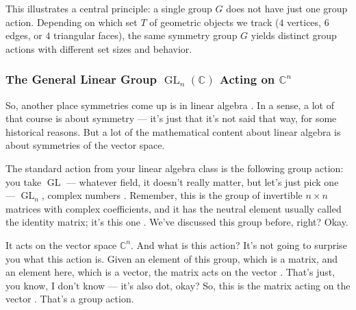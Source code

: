 \begin{content}
\begin{steps}
This illustrates a central principle: a single group $G$ does not have just one group action. Depending on which set $T$ of geometric objects we track ($4$ vertices, $6$ edges, or $4$ triangular faces), the same symmetry group $G$ yields distinct group actions with different set sizes and behavior.
\end{steps}
\end{content}

\subsubsection{The General Linear Group \texorpdfstring{$\operatorname{GL}_n(\mathbb{C})$}{GL\_n(C)} Acting on \texorpdfstring{$\mathbb{C}^n$}{C\textasciicircum n}}

\begin{speech}[00:58:29 - 01:00:01]
So, another place symmetries come up is in linear algebra . In a sense, a lot of that course is about symmetry --- it's just that it's not said that way, for some historical reasons. But a lot of the mathematical content about linear algebra is about symmetries of the vector space.

The standard action from your linear algebra class is the following group action: you take $\operatorname{GL}$ --- whatever field, it doesn't really matter, but let's just pick one --- $\operatorname{GL}_n$, complex numbers . Remember, this is the group of invertible $n \times n$ matrices with complex coefficients, and it has the neutral element usually called the identity matrix; it's this one . We've discussed this group before, right? Okay.

It acts on the vector space $\mathbb{C}^n$. And what is this action? It's not going to surprise you what this action is. Given an element of this group, which is a matrix, and an element here, which is a vector, the matrix acts on the vector . That's just, you know, I don't know --- it's also dot, okay? So, this is the matrix acting on the vector . That's a group action.
\end{speech}

